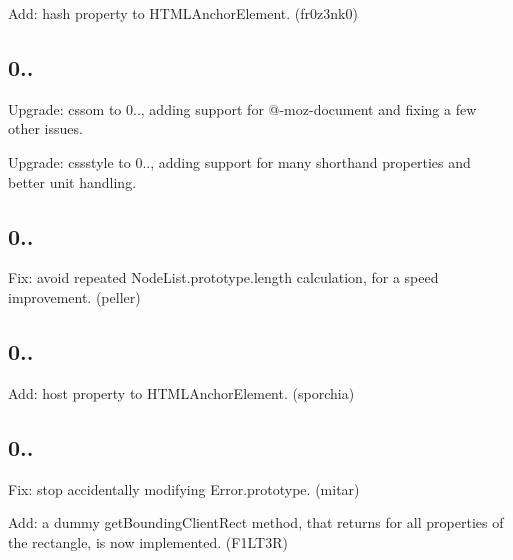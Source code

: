 \begin{DoxyItemize}
\item Add\+: {\ttfamily hash} property to {\ttfamily H\+T\+M\+L\+Anchor\+Element}. (fr0z3nk0)
\end{DoxyItemize}

\subsection*{0..}


\begin{DoxyItemize}
\item Upgrade\+: {\ttfamily cssom} to 0.., adding support for {\ttfamily @-\/moz-\/document} and fixing a few other issues.
\item Upgrade\+: {\ttfamily cssstyle} to 0.., adding support for many shorthand properties and better unit handling.
\end{DoxyItemize}

\subsection*{0..}


\begin{DoxyItemize}
\item Fix\+: avoid repeated {\ttfamily Node\+List.\+prototype.\+length} calculation, for a speed improvement. (peller)
\end{DoxyItemize}

\subsection*{0..}


\begin{DoxyItemize}
\item Add\+: {\ttfamily host} property to {\ttfamily H\+T\+M\+L\+Anchor\+Element}. (sporchia)
\end{DoxyItemize}

\subsection*{0..}


\begin{DoxyItemize}
\item Fix\+: stop accidentally modifying {\ttfamily Error.\+prototype}. (mitar)
\item Add\+: a dummy {\ttfamily get\+Bounding\+Client\+Rect} method, that returns {} for all properties of the rectangle, is now implemented. (F1\+L\+T3R)
\end{DoxyItemize}

